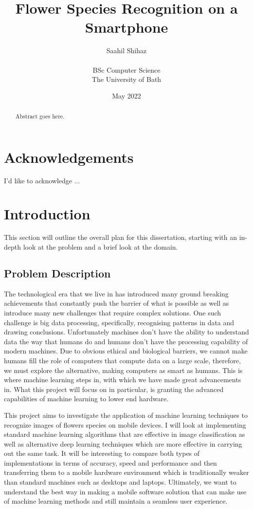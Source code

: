 \documentclass{article}
\title{Flower Species Recognition on a Smartphone}
\author{Saahil Shihaz\\\\BSc Computer Science\\The University of Bath}
\date{May 2022}
\begin{document}
\maketitle
\clearpage
\begin{abstract}

Abstract goes here.

\end{abstract}
\clearpage
\tableofcontents
\clearpage
\listoffigures
\clearpage
\section*{Acknowledgements}
\thispagestyle{empty}

I'd like to acknowledge ...

\clearpage
{}
\section{Introduction}

This section will outline the overall plan for this dissertation, starting with an in-depth look at the problem and a 
brief look at the domain.

\subsection{Problem Description}

The technological era that we live in has introduced many ground breaking achievements that constantly push the barrier 
of what is possible as well as introduce many new challenges that require complex solutions. One such challenge is big 
data processing, specifically, recognising patterns in data and drawing conclusions. Unfortunately machines don't have 
the ability to understand data the way that humans do and humans don't have the processing capability of modern 
machines. Due to obvious ethical and biological barriers, we cannot make humans fill the role of computers that compute 
data on a large scale, therefore, we must explore the alternative, making computers as smart as humans. This is where 
machine learning steps in, with which we have made great advancements in. What this project will focus on in particular,
is granting the advanced capabilities of machine learning to lower end hardware.

\par

This project aims to investigate the application of machine learning techniques to recognize images of flowers species 
on mobile devices. I will look at implementing standard machine learning algorithms that are effective in image 
classification as well as alternative deep learning techniques which are more effective in carrying out the same task. 
It will be interesting to compare both types of implementations in terms of accuracy, speed and performance and then 
transferring them to a mobile hardware environment which is traditionally weaker than standard machines such as desktops
and laptops. Ultimately, we want to understand the best way in making a mobile software solution that can make use of 
machine learning methods and still maintain a seamless user experience.
\end{document}
